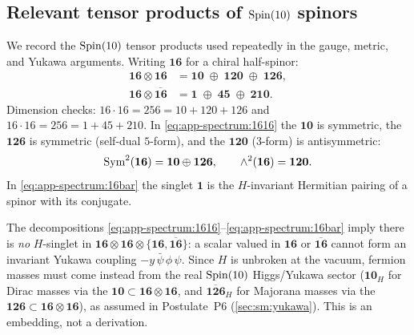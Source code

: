 \subsection{Relevant tensor products of $\operatorname{Spin}(10)$ spinors}
\label{sec:app-spectrum:tensor}

We record the $\operatorname{Spin}(10)$ tensor products used repeatedly in the gauge,
metric, and Yukawa arguments. Writing $\mathbf{16}$ for a chiral
half-spinor:
\begin{align}
  \mathbf{16}\otimes\mathbf{16}
    &= \mathbf{10}\;\oplus\;\mathbf{120}\;\oplus\;\mathbf{126},
    \label{eq:app-spectrum:1616}\\
  \mathbf{16}\otimes\overline{\mathbf{16}}
    &= \mathbf{1}\;\oplus\;\mathbf{45}\;\oplus\;\mathbf{210}.
    \label{eq:app-spectrum:16bar}
\end{align}
Dimension checks: $16\cdot16=256=10+120+126$ and
$16\cdot16=256=1+45+210$. In \eqref{eq:app-spectrum:1616} the
$\mathbf{10}$ is symmetric, the $\mathbf{126}$ is symmetric (self-dual
$5$-form), and the $\mathbf{120}$ ($3$-form) is antisymmetric:
\begin{equation}
  \operatorname{Sym}^2(\mathbf{16}) = \mathbf{10}\oplus\mathbf{126},
  \qquad
  \wedge^2(\mathbf{16}) = \mathbf{120}.
  \label{eq:app-spectrum:symanti}
\end{equation}
In \eqref{eq:app-spectrum:16bar} the singlet $\mathbf 1$ is the
$H$-invariant Hermitian pairing of a spinor with its conjugate.

\begin{remark}\label{rem:app-spectrum:yukawa}
The decompositions \eqref{eq:app-spectrum:1616}--\eqref{eq:app-spectrum:16bar}
imply there is \emph{no} $H$-singlet in
$\mathbf{16}\otimes\mathbf{16}\otimes\{\mathbf{16},\overline{\mathbf{16}}\}$:
a scalar valued in $\mathbf{16}$ or $\overline{\mathbf{16}}$ cannot form
an invariant Yukawa coupling $-y\,\bar\psi\,\phi\,\psi$. Since $H$ is
unbroken at the vacuum, fermion masses must come instead from the real
$\operatorname{Spin}(10)$ Higgs/Yukawa sector ($\mathbf{10}_H$ for Dirac masses via the
$\mathbf{10}\subset\mathbf{16}\otimes\mathbf{16}$, and
$\overline{\mathbf{126}}_H$ for Majorana masses via the
$\mathbf{126}\subset\mathbf{16}\otimes\mathbf{16}$), as assumed in
Postulate~P6 (\autoref{sec:sm:yukawa}). This is an embedding, not a
derivation.
\end{remark}

